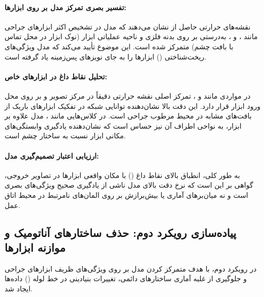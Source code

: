 \documentclass{article}
\begin{document}
\paragraph{تفسیر بصری تمرکز مدل بر روی ابزارها:} 
نقشه‌های حرارتی حاصل از  نشان می‌دهند که مدل در تشخیص اکثر ابزارهای جراحی مانند ،  و ، به‌درستی بر روی بدنه فلزی و ناحیه عملیاتی ابزار (نوک ابزار در محل تماس با بافت چشم) متمرکز شده است. این موضوع تأیید می‌کند که مدل ویژگی‌های ریخت‌شناختی () ابزارها را به جای نویزهای پس‌زمینه یاد گرفته است.

\paragraph{تحلیل نقاط داغ در ابزارهای خاص:} 
در مواردی مانند  و ، تمرکز اصلی نقشه حرارتی دقیقاً در مرکز تصویر و بر روی محل ورود ابزار قرار دارد. این دقت بالا نشان‌دهنده توانایی شبکه در تفکیک ابزارهای باریک از بافت‌های مشابه در محیط مرطوب جراحی است. در کلاس‌هایی مانند ، مدل علاوه بر ابزار، به نواحی اطراف آن نیز حساس است که نشان‌دهنده یادگیری وابستگی‌های مکانی ابزار نسبت به ساختار چشم است.


\paragraph{ارزیابی اعتبار تصمیم‌گیری مدل:} 
به طور کلی، انطباق بالای نقاط داغ () با مکان واقعی ابزارها در تصاویر خروجی، گواهی بر این است که نرخ دقت بالای مدل ناشی از یادگیری صحیح ویژگی‌های بصری است و نه میان‌برهای آماری یا بیش‌برازش بر روی المان‌های نامرتبط در محیط اتاق عمل.
\subsection{پیاده‌سازی رویکرد دوم: حذف ساختارهای آناتومیک و موازنه ابزارها}

در رویکرد دوم، با هدف متمرکز کردن مدل بر روی ویژگی‌های ظریف ابزارهای جراحی و جلوگیری از غلبه آماری ساختارهای دائمی، تغییرات بنیادینی در خط لوله () داده‌ها ایجاد شد.
\end{document}
